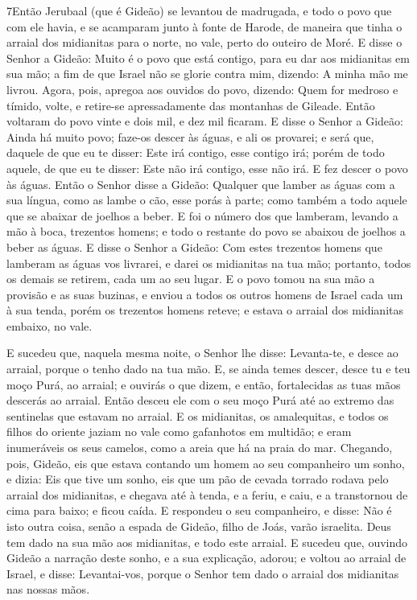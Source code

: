 \lettrine{7} Então Jerubaal (que é Gideão) se levantou de
madrugada, e todo o povo que com ele havia, e se acamparam junto à
fonte de Harode, de maneira que tinha o arraial dos midianitas para
o norte, no vale, perto do outeiro de Moré. E disse o Senhor a
Gideão: Muito é o povo que está contigo, para eu dar aos midianitas
em sua mão; a fim de que Israel não se glorie contra mim, dizendo: A
minha mão me livrou. Agora, pois, apregoa aos ouvidos do povo,
dizendo: Quem for medroso e tímido, volte, e retire-se
apressadamente das montanhas de Gileade. Então voltaram do povo
vinte e dois mil, e dez mil ficaram. E disse o Senhor a Gideão:
Ainda há muito povo; faze-os descer às águas, e ali os provarei; e
será que, daquele de que eu te disser: Este irá contigo, esse
contigo irá; porém de todo aquele, de que eu te disser: Este não irá
contigo, esse não irá. E fez descer o povo às águas. Então o
Senhor disse a Gideão: Qualquer que lamber as águas com a sua
língua, como as lambe o cão, esse porás à parte; como também a todo
aquele que se abaixar de joelhos a beber. E foi o número dos que
lamberam, levando a mão à boca, trezentos homens; e todo o restante
do povo se abaixou de joelhos a beber as águas. E disse o Senhor
a Gideão: Com estes trezentos homens que lamberam as águas vos
livrarei, e darei os midianitas na tua mão; portanto, todos os
demais se retirem, cada um ao seu lugar. E o povo tomou na sua
mão a provisão e as suas buzinas, e enviou a todos os outros homens
de Israel cada um à sua tenda, porém os trezentos homens reteve; e
estava o arraial dos midianitas embaixo, no vale.

E sucedeu que, naquela mesma noite, o Senhor lhe disse:
Levanta-te, e desce ao arraial, porque o tenho dado na tua mão.
E, se ainda temes descer, desce tu e teu moço Purá, ao
arraial; e ouvirás o que dizem, e então, fortalecidas as tuas
mãos descerás ao arraial. Então desceu ele com o seu moço Purá até
ao extremo das sentinelas que estavam no arraial. E os
midianitas, os amalequitas, e todos os filhos do oriente jaziam no
vale como gafanhotos em multidão; e eram inumeráveis os seus
camelos, como a areia que há na praia do mar. Chegando, pois,
Gideão, eis que estava contando um homem ao seu companheiro um
sonho, e dizia: Eis que tive um sonho, eis que um pão de cevada
torrado rodava pelo arraial dos midianitas, e chegava até à tenda, e
a feriu, e caiu, e a transtornou de cima para baixo; e ficou caída.
E respondeu o seu companheiro, e disse: Não é isto outra
coisa, senão a espada de Gideão, filho de Joás, varão israelita.
Deus tem dado na sua mão aos midianitas, e todo este arraial.
E sucedeu que, ouvindo Gideão a narração deste sonho, e a sua
explicação, adorou; e voltou ao arraial de Israel, e disse:
Levantai-vos, porque o Senhor tem dado o arraial dos midianitas nas
nossas mãos.

